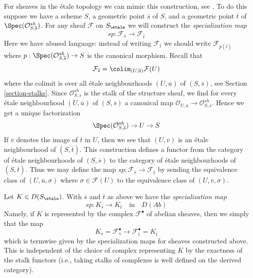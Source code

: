 \medskip\noindent
For sheaves in the \'etale topology we can mimic this construction, see
\cite[Exposee VIII, 7.7, page 397]{SGA4}. To do this suppose we have
a scheme $S$, a geometric point $\overline{s}$ of $S$, and a geometric
point $\overline{t}$ of $\Spec(\mathcal{O}^{sh}_{S, \overline{s}})$.
For any sheaf $\mathcal{F}$ on $S_\etale$ we will construct the
{\it specialization map}
$$
sp : \mathcal{F}_{\overline{s}} \longrightarrow \mathcal{F}_{\overline{t}}
$$
Here we have abused language: instead of writing
$\mathcal{F}_{\overline{t}}$ we should write $\mathcal{F}_{p(\overline{t})}$
where $p : \Spec(\mathcal{O}^{sh}_{S, \overline{s}}) \to S$ is the canonical
morphism. Recall that
$$
\mathcal{F}_{\overline{s}} = \colim_{(U, \overline{u})} \mathcal{F}(U)
$$
where the colimit is over all \'etale neighbourhoods $(U, \overline{u})$
of $(S, \overline{s})$, see Section \ref{section-stalks}. Since
$\mathcal{O}^{sh}_{S, \overline{s}}$ is the stalk of the
structure sheaf, we find for every \'etale neighbourhood
$(U, \overline{u})$ of $(S, \overline{s})$ a canonical map
$\mathcal{O}_{U, u} \to \mathcal{O}^{sh}_{S, \overline{s}}$.
Hence we get a unique factorization
$$
\Spec(\mathcal{O}^{sh}_{S, \overline{s}}) \to U \to S
$$
If $\overline{v}$ denotes the image of $\overline{t}$ in $U$, then we see that
$(U, \overline{v})$ is an \'etale neighbourhood of $(S, \overline{t})$.
This construction defines a functor from the category of \'etale neighbourhoods
of $(S, \overline{s})$ to the category of \'etale neighbourhoods of
$(S, \overline{t})$. Thus we may define the map
$sp : \mathcal{F}_{\overline{s}} \to \mathcal{F}_{\overline{t}}$
by sending the equivalence class of
$(U, \overline{u}, \sigma)$ where $\sigma \in \mathcal{F}(U)$
to the equivalence class of $(U, \overline{v}, \sigma)$.

\medskip\noindent
Let $K \in D(S_\etale)$. With $\overline{s}$ and $\overline{t}$
as above we have the {\it specialization map}
$$
sp : K_{\overline{s}} \longrightarrow K_{\overline{t}}
\quad\text{in}\quad D(\textit{Ab})
$$
Namely, if $K$ is represented by the complex $\mathcal{F}^\bullet$
of abelian sheaves, then we simply that the map
$$
K_{\overline{s}} = \mathcal{F}^\bullet_{\overline{s}}
\longrightarrow
\mathcal{F}^\bullet_{\overline{t}} = K_{\overline{t}}
$$
which is termwise given by the specialization maps for sheaves
constructed above. This is independent of the choice of complex
representing $K$ by the exactness of the stalk functors (i.e.,
taking stalks of complexes is well defined on the derived category).


